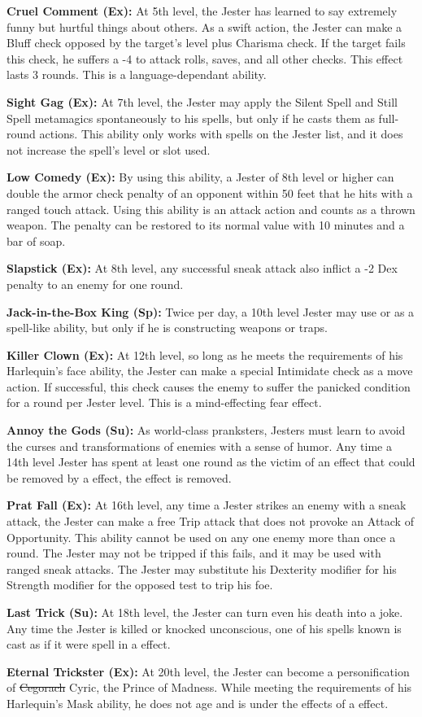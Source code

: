 \textbf{Cruel Comment (Ex):} At 5th level, the Jester has learned to say extremely funny but hurtful things about others. As a swift action, the Jester can make a Bluff check opposed by the target's level plus Charisma check. If the target fails this check, he suffers a -4 to attack rolls, saves, and all other checks. This effect lasts 3 rounds. This is a language-dependant ability.

\textbf{Sight Gag (Ex):} At 7th level, the Jester may apply the Silent Spell and Still Spell metamagics spontaneously to his spells, but only if he casts them as full-round actions. This ability only works with spells on the Jester list, and it does not increase the spell's level or slot used.

\textbf{Low Comedy (Ex):} By using this ability, a Jester of 8th level or higher can double the armor check penalty of an opponent within 50 feet that he hits with a ranged touch attack. Using this ability is an attack action and counts as a thrown weapon. The penalty can be restored to its normal value with 10 minutes and a bar of soap.

\textbf{Slapstick (Ex):} At 8th level, any successful sneak attack also inflict a -2 Dex penalty to an enemy for one round.

\textbf{Jack-in-the-Box King (Sp):} Twice per day, a 10th level Jester may use  or  as a spell-like ability, but only if he is constructing weapons or traps.

\textbf{Killer Clown (Ex):} At 12th level, so long as he meets the requirements of his Harlequin's face ability, the Jester can make a special Intimidate check as a move action. If successful, this check causes the enemy to suffer the panicked condition for a round per Jester level. This is a mind-effecting fear effect.

\textbf{Annoy the Gods (Su):} As world-class pranksters, Jesters must learn to avoid the curses and transformations of enemies with a sense of humor. Any time a 14th level Jester has spent at least one round as the victim of an effect that could be removed by a  effect, the effect is removed.

\textbf{Prat Fall (Ex):} At 16th level, any time a Jester strikes an enemy with a sneak attack, the Jester can make a free Trip attack that does not provoke an Attack of Opportunity. This ability cannot be used on any one enemy more than once a round. The Jester may not be tripped if this fails, and it may be used with ranged sneak attacks. The Jester may substitute his Dexterity modifier for his Strength modifier for the opposed test to trip his foe.

\textbf{Last Trick (Su):} At 18th level, the Jester can turn even his death into a joke. Any time the Jester is killed or knocked unconscious, one of his spells known is cast as if it were spell in a  effect.

\textbf{Eternal Trickster (Ex):} At 20th level, the Jester can become a personification of \sout{Cegorach} Cyric, the Prince of Madness. While meeting the requirements of his Harlequin's Mask ability, he does not age and is under the effects of a  effect.
